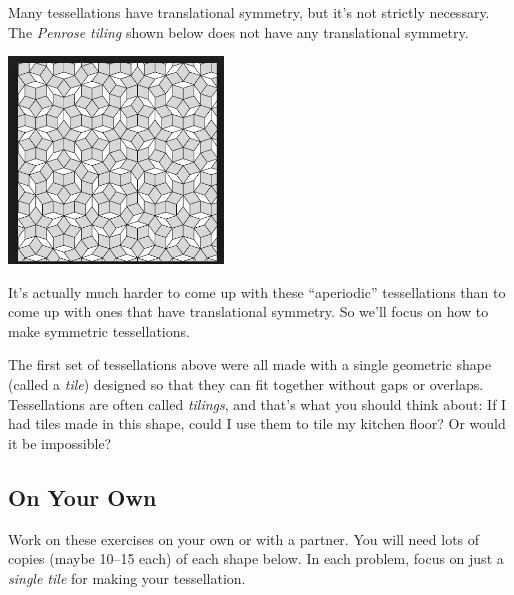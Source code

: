 \documentclass[12pt, reqno]{amsart}
\theoremstyle{remark}
\theoremstyle{definition}
\numberwithin{equation}{section}  %
\begin{document}
Many tessellations have translational symmetry, but it's not strictly necessary.  The \emph{Penrose tiling} shown below does not have any translational symmetry.  

\begin{center}
\includegraphics[height=5.5cm]{tessellate8}
\end{center}


It's actually much harder to come up with these ``aperiodic'' tessellations than to come up with ones that have translational symmetry.  So we'll focus on how to make symmetric tessellations.

The first set of tessellations above were all made with a single geometric shape (called a \emph{tile}) designed so that they can fit together without gaps or overlaps.  Tessellations are often called \emph{tilings}, and that's what you should think about: If I had tiles made in this shape, could I use them to tile my kitchen floor?  Or would it be impossible?

\subsection*{On Your Own}
Work on these exercises on your own or with a partner.  You will need lots of copies (maybe 10--15 each) of each shape below.
In each problem, focus on just a \emph{single tile} for making your tessellation.
\end{document}
